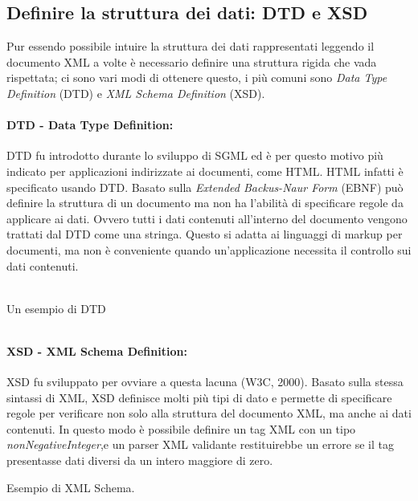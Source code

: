 \subsection{Definire la struttura dei dati: DTD e XSD}
Pur essendo possibile intuire la struttura dei dati rappresentati leggendo il documento XML a volte è necessario definire una struttura rigida che vada rispettata; ci sono vari modi di ottenere questo, i più comuni sono \emph{Data Type Definition} (DTD) e \emph{XML Schema Definition} (XSD).

\paragraph{DTD - Data Type Definition:}DTD fu introdotto durante lo sviluppo di SGML ed è per questo motivo più indicato per applicazioni indirizzate ai documenti, come HTML. HTML infatti è specificato usando DTD. Basato sulla \emph{Extended Backus-Naur Form} (EBNF) può definire la struttura di un documento ma non ha l'abilità di specificare regole da applicare ai dati. Ovvero tutti i dati contenuti all'interno del documento vengono trattati dal DTD come una stringa. Questo si adatta ai linguaggi di markup per documenti, ma non è conveniente quando un'applicazione necessita il controllo sui dati contenuti.
\\\\
\begin{flushleft}
\begin{example}
Un esempio di DTD\\
\inputminted[linenos,frame=lines]{dtd}{esempio1.dtd}
\label{lst:dtd_example}
\end{example}
\end{flushleft}

\paragraph{XSD - XML Schema Definition:}XSD fu sviluppato per ovviare a questa lacuna (W3C, 2000). Basato sulla stessa sintassi di XML, XSD definisce molti più tipi di dato e permette di specificare regole per verificare non solo alla struttura del documento XML, ma anche ai dati contenuti. In questo modo è possibile definire un tag XML con un tipo \emph{nonNegativeInteger},e un parser XML validante restituirebbe un errore se il tag presentasse dati diversi da un intero maggiore di zero.
\begin{flushleft}
\begin{example}
Esempio di XML Schema.
\inputminted[linenos,frame=lines]{xml}{esempio1.xsd}
\label{lst:xsd_example}
\end{example}
\end{flushleft}

